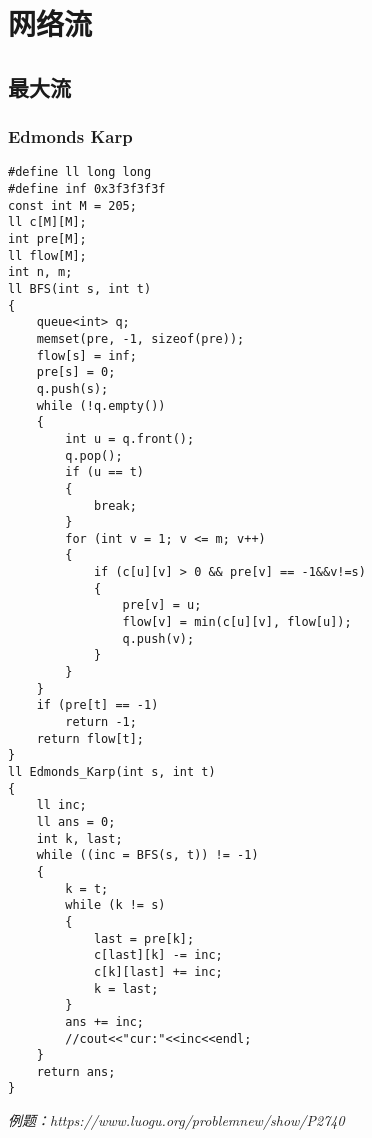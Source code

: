 \section{网络流}
\subsection{最大流}
\subsubsection{Edmonds Karp}
\begin{lstlisting}
#define ll long long
#define inf 0x3f3f3f3f
const int M = 205;
ll c[M][M];
int pre[M];
ll flow[M];
int n, m;
ll BFS(int s, int t)
{
    queue<int> q;
    memset(pre, -1, sizeof(pre));
    flow[s] = inf;
    pre[s] = 0;
    q.push(s);
    while (!q.empty())
    {
        int u = q.front();
        q.pop();
        if (u == t)
        {
            break;
        }
        for (int v = 1; v <= m; v++)
        {
            if (c[u][v] > 0 && pre[v] == -1&&v!=s)
            {
                pre[v] = u;
                flow[v] = min(c[u][v], flow[u]);
                q.push(v);
            }
        }
    }
    if (pre[t] == -1)
        return -1;
    return flow[t];
}
ll Edmonds_Karp(int s, int t)
{
    ll inc;
    ll ans = 0;
    int k, last;
    while ((inc = BFS(s, t)) != -1)
    {
        k = t;
        while (k != s)
        {
            last = pre[k];
            c[last][k] -= inc;
            c[k][last] += inc;
            k = last;
        }
        ans += inc;
        //cout<<"cur:"<<inc<<endl;
    }
    return ans;
}
\end{lstlisting}
\emph{例题：https://www.luogu.org/problemnew/show/P2740}

